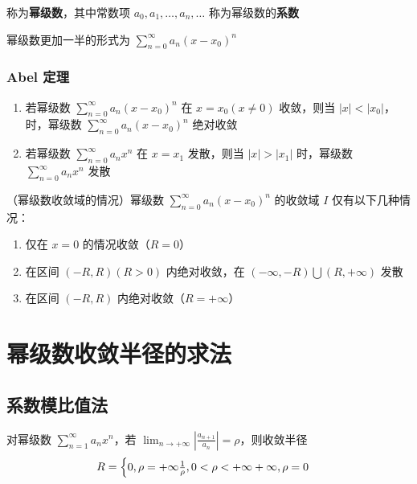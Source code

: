 \documentclass[lang = zh , final , oneside , openany , titlepage , zihao = -4 , linespread = 1.3 , baselineskip = false , cjk-font = windows , text-font = newtx , math-font = newtx , math-style = ISO , uppercase-greek = upright , integral-limits = false]{sjtureport}
\begin{document}
称为\textbf{幂级数}，其中常数项 \(a_0,a_1,\ldots,a_n,\ldots\)
称为幂级数的\textbf{系数}

幂级数更加一半的形式为 \(\displaystyle \sum_{n=0}^\infty a_n(x-x_0)^n\)

\subsubsection{Abel 定理}

\begin{enumerate}
\item
  若幂级数 \(\displaystyle \sum_{n=0}^\infty a_n(x-x_0)^n\) 在
  \(x=x_0(x\neq 0)\) 收敛，则当
  \(\vert x \vert <\vert x_0\vert\)，时，幂级数
  \(\displaystyle \sum_{n=0}^\infty a_n(x-x_0)^n\) 绝对收敛
\item
  若幂级数 \(\displaystyle \sum_{n=0}^\infty a_nx^n\) 在 \(x=x_1\)
  发散，则当 \(\vert x \vert >\vert x_1\vert\) 时，幂级数
  \(\displaystyle \sum_{n=0}^\infty a_nx^n\) 发散
\end{enumerate}

\begin{lemma}
    （幂级数收敛域的情况）幂级数 \(\displaystyle \sum_{n=0}^\infty a_n(x-x_0)^n\) 的收敛域 \(I\)
仅有以下几种情况：

\begin{enumerate}
\def\labelenumi{\arabic{enumi}.}
\item
  仅在 \(x=0\) 的情况收敛（\(R=0\)）
\item
  在区间 \((-R,R)(R>0)\) 内绝对收敛，在
  \((-\infty ,-R)\bigcup(R,+\infty)\) 发散
\item
  在区间 \((-R,R)\) 内绝对收敛（\(R=+\infty\)）
\end{enumerate}
\end{lemma}

\section{幂级数收敛半径的求法}

\subsection{系数模比值法}

\begin{theorem}
    对幂级数 \(\displaystyle \sum_{n=1}^\infty a_nx^n\)，若
\(\displaystyle \lim_{n\to+\infty}\left\vert\frac{a_{n+1}}{a_n}\right\vert = \rho\)，则收敛半径
\[\displaystyle R=\begin{cases}0,\rho=+\infty\newline  \frac{1}{\rho}, 0<\rho<+\infty\newline +\infty ,\rho=0\end{cases}\]
\end{theorem}
\end{document}
